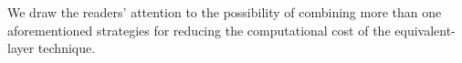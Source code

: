 We draw the readers' attention to the possibility of combining more than one aforementioned strategies for reducing the computational cost of the equivalent-layer technique.





